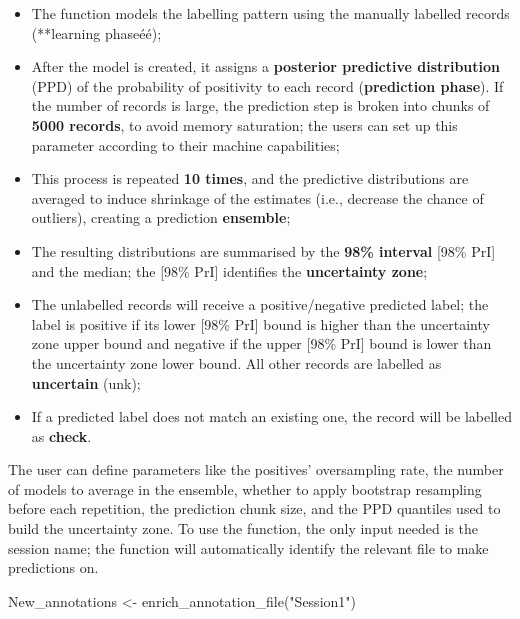 \documentclass[
]{article}
\newenvironment{Shaded}{\begin{snugshade}}{\end{snugshade}}
\newcommand{\FunctionTok}[1]{\textcolor[rgb]{0.00,0.00,0.00}{#1}}
\newcommand{\NormalTok}[1]{#1}
\newcommand{\OtherTok}[1]{\textcolor[rgb]{0.56,0.35,0.01}{#1}}
\newcommand{\StringTok}[1]{\textcolor[rgb]{0.31,0.60,0.02}{#1}}
\providecommand{\tightlist}{%
  \setlength{\itemsep}{0pt}\setlength{\parskip}{0pt}}
\begin{document}
\begin{itemize}
\tightlist
\item
  The function models the labelling pattern using the manually labelled
  records (**learning phaseéé);
\item
  After the model is created, it assigns a \textbf{posterior predictive
  distribution} (PPD) of the probability of positivity to each record
  (\textbf{prediction phase}). If the number of records is large, the
  prediction step is broken into chunks of \textbf{5000 records}, to
  avoid memory saturation; the users can set up this parameter according
  to their machine capabilities;
\item
  This process is repeated \textbf{10 times}, and the predictive
  distributions are averaged to induce shrinkage of the estimates (i.e.,
  decrease the chance of outliers), creating a prediction
  \textbf{ensemble};
\item
  The resulting distributions are summarised by the \textbf{98\%
  interval} {[}98\% PrI{]} and the median; the {[}98\% PrI{]} identifies
  the \textbf{uncertainty zone};
\item
  The unlabelled records will receive a positive/negative predicted
  label; the label is positive if its lower {[}98\% PrI{]} bound is
  higher than the uncertainty zone upper bound and negative if the upper
  {[}98\% PrI{]} bound is lower than the uncertainty zone lower bound.
  All other records are labelled as \textbf{uncertain} (unk);
\item
  If a predicted label does not match an existing one, the record will
  be labelled as \textbf{check}.
\end{itemize}

The user can define parameters like the positives' oversampling rate,
the number of models to average in the ensemble, whether to apply
bootstrap resampling before each repetition, the prediction chunk size,
and the PPD quantiles used to build the uncertainty zone. To use the
function, the only input needed is the session name; the function will
automatically identify the relevant file to make predictions on.

\begin{Shaded}
\begin{Highlighting}[]
\NormalTok{New\_annotations }\OtherTok{\textless{}{-}} \FunctionTok{enrich\_annotation\_file}\NormalTok{(}\StringTok{"Session1"}\NormalTok{)}
\end{Highlighting}
\end{Shaded}
\end{document}
